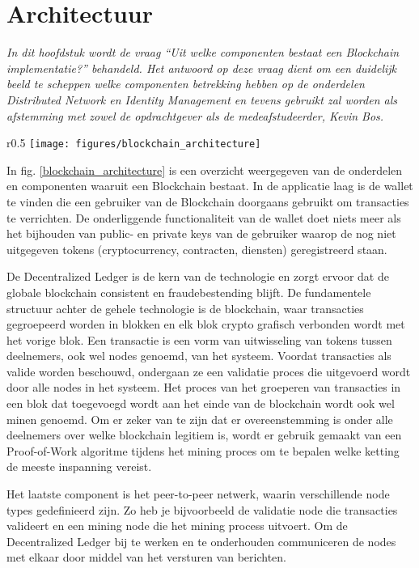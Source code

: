 \section{Architectuur}
\label{chapter:architecture}

\textit{
  In dit hoofdstuk wordt de vraag ``Uit welke componenten bestaat een Blockchain implementatie?'' behandeld. Het antwoord op deze vraag dient om een duidelijk beeld te scheppen welke componenten betrekking hebben op de onderdelen Distributed Network en Identity Management en tevens gebruikt zal worden als afstemming met zowel de opdrachtgever als de medeafstudeerder, Kevin Bos. 
}

\begin{wrapfigure}{r}{0.5\textwidth}
  \texttt{[image: figures/blockchain\_architecture]}
  \caption{Blockchain architectuur.}
  \label{blockchain_architecture}
\end{wrapfigure}

In fig. \ref{blockchain_architecture} is een overzicht weergegeven van de onderdelen en componenten waaruit een Blockchain bestaat. In de applicatie laag is de wallet te vinden die een gebruiker van de Blockchain doorgaans gebruikt om transacties te verrichten. De onderliggende functionaliteit van de wallet doet niets meer als het bijhouden van public- en private keys van de gebruiker waarop de nog niet uitgegeven tokens (cryptocurrency, contracten, diensten) geregistreerd staan.

De Decentralized Ledger is de kern van de technologie en zorgt ervoor dat de globale blockchain consistent en fraudebestending blijft. De fundamentele structuur achter de gehele technologie is de blockchain, waar transacties gegroepeerd worden in blokken en elk blok crypto grafisch verbonden wordt met het vorige blok. Een transactie is een vorm van uitwisseling van tokens tussen deelnemers, ook wel nodes genoemd, van het systeem. Voordat transacties als valide worden beschouwd, ondergaan ze een validatie proces die uitgevoerd wordt door alle nodes in het systeem. Het proces van het groeperen van transacties in een blok dat toegevoegd wordt aan het einde van de blockchain wordt ook wel minen genoemd. Om er zeker van te zijn dat er overeenstemming is onder alle deelnemers over welke blockchain legitiem is, wordt er gebruik gemaakt van een Proof-of-Work algoritme tijdens het mining proces om te bepalen welke ketting de meeste inspanning vereist.

Het laatste component is het peer-to-peer netwerk, waarin verschillende node types gedefinieerd zijn. Zo heb je bijvoorbeeld de validatie node die transacties valideert en een mining node die het mining process uitvoert. Om de Decentralized Ledger bij te werken en te onderhouden communiceren de nodes met elkaar door middel van het versturen van berichten.